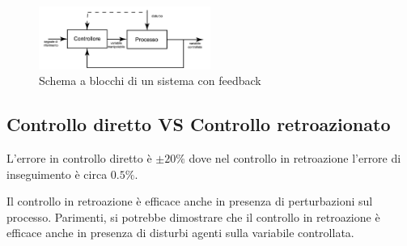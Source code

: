 \begin{figure}[!ht]
  \centering
  \includegraphics[width=0.5\textwidth]{./images/feedback.png}
  \caption{Schema a blocchi di un sistema con feedback}
  \label{fig:feedback}
\end{figure}


\subsection{Controllo diretto VS Controllo retroazionato}

L'errore in controllo diretto è $\pm 20 \%$ dove nel controllo in retroazione l'errore di inseguimento è circa $0.5\%$.

Il controllo in retroazione è efficace anche in presenza di perturbazioni sul processo. Parimenti, si potrebbe dimostrare che il controllo in retroazione è efficace anche in presenza di disturbi agenti sulla variabile controllata.


